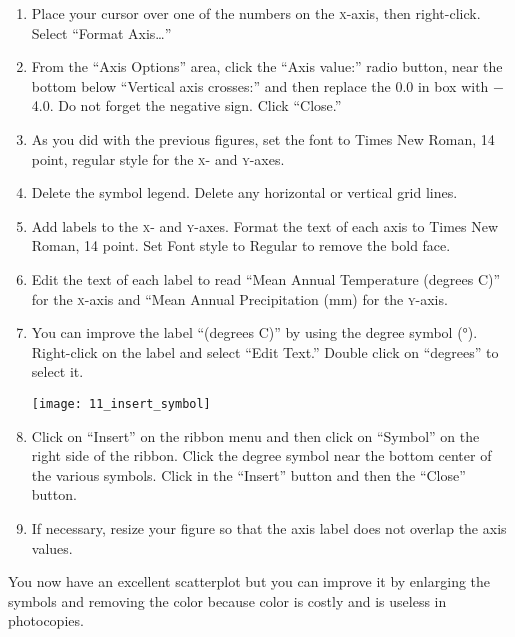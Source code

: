 \documentclass[12pt, hidelinks]{exam}
\newcommand*\axis[1]{{\scshape #1}-axis}
\begin{document}
\begin{questions}
\begin{enumerate}[resume]
	\item Place your cursor over one of the numbers on the \axis{x}, then right-click. Select “Format Axis\dots”

	\item From the “Axis Options” area, click the “Axis value:” radio button, near the bottom below “Vertical axis crosses:” and then replace the 0.0 in box with $-$4.0. Do not forget the negative sign. Click “Close.” 

	\item As you did with the previous figures, set the font to Times New Roman, 14 point, regular style for the \textsc{x}- and \textsc{y}-axes.
	
	\item Delete the symbol legend. Delete any horizontal or vertical grid lines.
	
	\item Add labels to the \textsc{x}- and \textsc{y}-axes. Format the text of each axis to Times New Roman, 14 point. Set Font style to Regular to remove the bold face.
	
	\item Edit the text of each label to read “Mean Annual Temperature (degrees C)” for the \axis{x} and “Mean Annual Precipitation (mm) for the \axis{y}.

	\item You can improve the label “(degrees C)” by using the degree symbol (°). Right-click on the label and select “Edit Text.” Double click on “degrees” to select it.

\begin{center}
	\texttt{[image: 11\_insert\_symbol]}
\end{center}

	\item Click on “Insert” on the ribbon menu and then click on “Symbol” on the right side of the ribbon. Click the degree symbol near the bottom center of the various symbols. Click in the “Insert” button and then the “Close” button. 

	\item If necessary, resize your figure so that the axis label does not overlap the axis values.

\end{enumerate}

You now have an excellent scatterplot but you can improve it by enlarging the symbols and removing the color because  color is costly and is useless in photocopies.


\end{questions}
\end{document}
